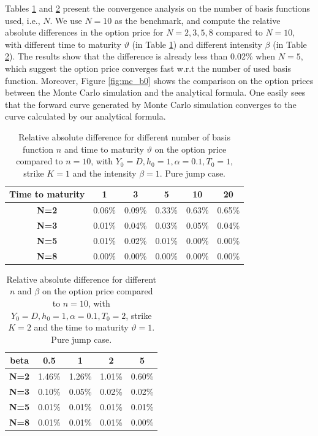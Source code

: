 \documentclass[10pt,a4paper,reqno]{amsart}
\numberwithin{equation}{section}
\theoremstyle{plain}
\theoremstyle{definition}
\theoremstyle{example}
\begin{document}
  Tables \ref{tab:n_theta_b0} and \ref{tab:n_beta_b0} present the convergence analysis on the number of basis functions used, i.e., $N$. We use $N=10$ as the benchmark, and compute the relative absolute differences in the option price for $N=2, 3, 5, 8$ compared to $N=10$, with different time to maturity $\vartheta$ (in Table \ref{tab:n_theta_b0}) and different intensity $\beta$ (in Table \ref{tab:n_beta_b0}). The results show that the difference is already less than 0.02\% when $N=5$, which suggest the option price converges fast w.r.t the number of used basis function.  Moreover, Figure \ref{fig:mc_b0} shows the comparison on the option prices between the Monte Carlo simulation and the analytical formula. One easily sees that the forward curve generated by Monte Carlo simulation converges to the curve calculated by our analytical formula.

\begin{table}[ht]
    \centering
    \begin{tabular}{|c|ccccc|}
        \hline
        \textbf{Time to maturity} & \textbf{1} & \textbf{3} & \textbf{5} & \textbf{10} & \textbf{20} \\ \hline
        \textbf{N=2} & 0.06\% & 0.09\% & 0.33\% & 0.63\% & 0.65\% \\ 
        \textbf{N=3} & 0.01\% & 0.04\% & 0.03\% & 0.05\% & 0.04\% \\ 
        \textbf{N=5} & 0.01\% & 0.02\% & 0.01\% & 0.00\% & 0.00\% \\ 
        \textbf{N=8} & 0.00\% & 0.00\% & 0.00\% & 0.00\% & 0.00\% \\ \hline
    \end{tabular}
    \vspace{2mm}
    \caption{Relative absolute difference for different number of basis function $n$ and time to maturity $\vartheta$ on the option price compared to $n=10$, with $Y_0=D, h_0=1, \alpha=0.1, T_0=1$, strike $K=1$ and the intensity $\beta=1$. Pure jump case.}
    \label{tab:n_theta_b0}
\end{table}

\begin{table}[ht]
    \centering
    \begin{tabular}{|c|cccc|}
        \hline
        \textbf{beta} & \textbf{0.5} & \textbf{1} & \textbf{2} & \textbf{5} \\ \hline
        \textbf{N=2} & 1.46\% & 1.26\% & 1.01\% & 0.60\% \\
        \textbf{N=3} & 0.10\% & 0.05\% & 0.02\% & 0.02\% \\ 
        \textbf{N=5} & 0.01\% & 0.01\% & 0.01\% & 0.01\% \\ 
        \textbf{N=8} & 0.01\% & 0.01\% & 0.01\% & 0.00\% \\ \hline
    \end{tabular}
      \vspace{2mm}
    \caption{Relative absolute difference for different $n$ and $\beta$ on the option price compared to $n=10$, with $Y_0=D, h_0=1, \alpha=0.1, T_0=2$, strike $K=2$ and the time to maturity $\vartheta=1$. Pure jump case.}
    \label{tab:n_beta_b0}
\end{table}
\end{document}
